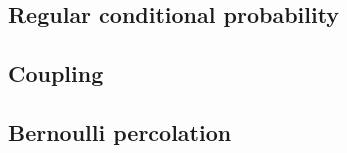 \documentclass[12pt]{article}
\newcommand{\1}{\mathbbm{1}}
\newcommand{\5}{\vspace{0.5cm}}
\theoremstyle{definition}
\begin{document}
\subsection{Regular conditional probability}


\subsection{Coupling}


\subsection{Bernoulli percolation}


\pagebreak

\end{document}
